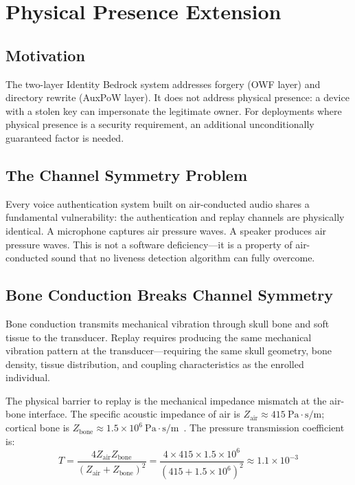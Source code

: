 \documentclass[12pt,a4paper]{article}
\begin{document}
\section{Physical Presence Extension}
\label{sec:physical}

\subsection{Motivation}

The two-layer Identity Bedrock system addresses forgery (OWF layer) and
directory rewrite (AuxPoW layer). It does not address physical presence:
a device with a stolen key can impersonate the legitimate owner. For
deployments where physical presence is a security requirement, an
additional unconditionally guaranteed factor is needed.

\subsection{The Channel Symmetry Problem}

Every voice authentication system built on air-conducted audio shares a
fundamental vulnerability: the authentication and replay channels are
physically identical. A microphone captures air pressure waves. A speaker
produces air pressure waves. This is not a software deficiency---it is a
property of air-conducted sound that no liveness detection algorithm can
fully overcome.

\subsection{Bone Conduction Breaks Channel Symmetry}
\label{sec:bone-formal}

Bone conduction transmits mechanical vibration through skull bone and
soft tissue to the transducer. Replay requires producing the same
mechanical vibration pattern at the transducer---requiring the same skull
geometry, bone density, tissue distribution, and coupling characteristics
as the enrolled individual.

The physical barrier to replay is the mechanical impedance mismatch at
the air-bone interface. The specific acoustic impedance of air is
$Z_\mathrm{air} \approx 415~\mathrm{Pa{\cdot}s/m}$; cortical bone is
$Z_\mathrm{bone} \approx 1.5 \times
10^6~\mathrm{Pa{\cdot}s/m}$~\cite{Kinsler00}. The pressure transmission
coefficient is:
\begin{equation}
  T = \frac{4 Z_\mathrm{air} Z_\mathrm{bone}}
           {(Z_\mathrm{air} + Z_\mathrm{bone})^2}
    = \frac{4 \times 415 \times 1.5 \times 10^6}
           {(415 + 1.5 \times 10^6)^2}
    \approx 1.1 \times 10^{-3}
  \label{eq:transmission}
\end{equation}
\end{document}
